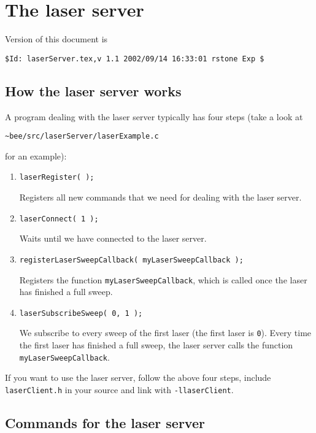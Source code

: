 \documentclass{article}
\begin{document}
\section{The laser server}

Version of this document is
\begin{verbatim}
$Id: laserServer.tex,v 1.1 2002/09/14 16:33:01 rstone Exp $
\end{verbatim}

\subsection{How the laser server works} 
 
A program dealing with the laser server typically has four steps (take a look at
\begin{center} 
  \texttt{\~{}bee/src/laserServer/laserExample.c}
\end{center}
for an example):

\begin{enumerate}
  
\item \texttt{laserRegister( );} 
  
  Registers all new commands that we need for dealing with the laser server.
  
\item \texttt{laserConnect( 1 );} 
  
  Waits until we have connected to the laser server.
  
\item \texttt{registerLaserSweepCallback( myLaserSweepCallback );} 
  
  Registers the function \texttt{myLaserSweepCallback}, which is called once
  the laser has finished a full sweep.

\item \texttt{laserSubscribeSweep( 0, 1 );}
  
  We subscribe to every sweep of the first laser (the first laser is
  \texttt{0}). Every time the first laser has finished a full sweep, the laser
  server calls the function \texttt{myLaserSweepCallback}.

\end{enumerate}
 
If you want to use the laser server, follow the above four steps, include
\texttt{laserClient.h} in your source and link with \texttt{-llaserClient}.

\subsection{Commands for the laser server}
\end{document}
